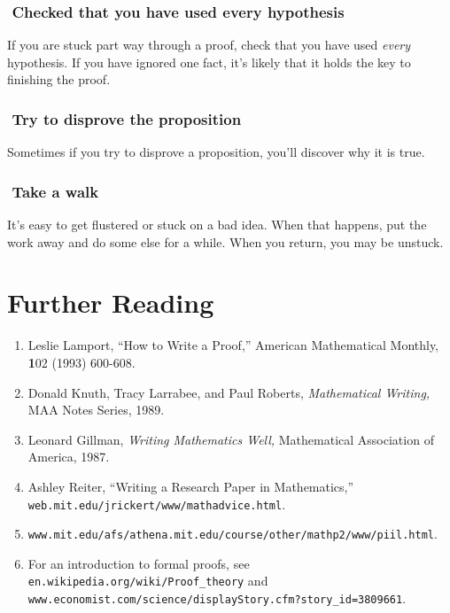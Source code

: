 \documentclass[12pt,fleqn]{article}
\newenvironment{numlist}{
  \begin{enumerate}[(1)]
    \addtolength{\itemsep}{-1.0\itemsep}}
  {\end{enumerate}}
\newcounter{ex}\setcounter{ex}{0}
\newcounter{id}\setcounter{id}{0}
\newcommand{\id}{%
\hspace{-0.2in} \setcounter{id}{\value{id}+1}
\theid \,\,}
\newcounter{se}\setcounter{se}{0}
\begin{document}
\subsubsection*{\id Checked that you have used every hypothesis}

If you are stuck part way through a proof, check that you have
used {\em every\/} hypothesis.  If you have ignored one fact,  it's likely
that it holds the key to finishing the proof.

\subsubsection*{\id Try to disprove the proposition}

Sometimes if you try to disprove a proposition, you'll discover why
it is true.

\subsubsection*{\id Take a walk}

It's easy to get flustered or stuck on a bad idea.  When that happens,
put the work away and do some else for a while.  When you return, you may
be unstuck.


\section*{Further Reading}

\begin{numlist}

\item Leslie Lamport, ``How to Write a Proof,'' American Mathematical Monthly, { \textbf 102} 
(1993) 600-608.  

\item Donald Knuth, Tracy Larrabee, and Paul Roberts, {\em Mathematical
  Writing,\/} MAA Notes Series, 1989.

\item Leonard Gillman, {\em Writing Mathematics Well,\/} Mathematical
Association of America, 1987.

\item Ashley Reiter, ``Writing a Research Paper in Mathematics,'' \\
\verb|web.mit.edu/jrickert/www/mathadvice.html|.

\item \verb|www.mit.edu/afs/athena.mit.edu/course/other/mathp2/www/piil.html|.

\item For an introduction to formal proofs, see \verb|en.wikipedia.org/wiki/Proof_theory|
and \verb| www.economist.com/science/displayStory.cfm?story_id=3809661|.

\end{numlist}
\end{document}
